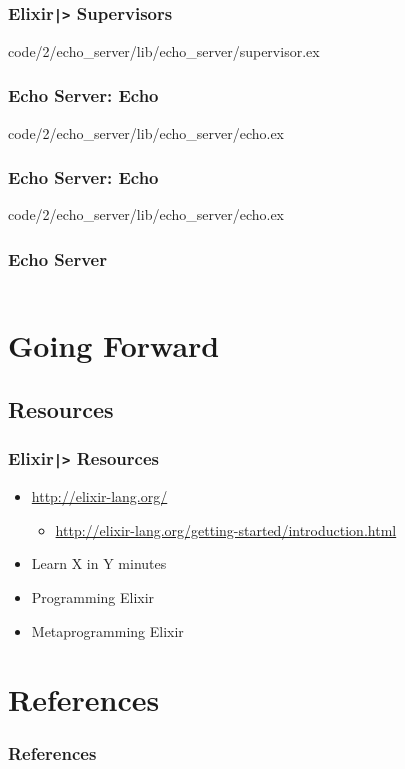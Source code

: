 \documentclass[english]{beamer}
\begin{document}
\begin{frame}[fragile]
\frametitle{Elixir\texttt{|>} Supervisors}

    {code/2/echo_server/lib/echo_server/supervisor.ex}
\end{frame}

\begin{frame}[fragile]
\frametitle{Echo Server: Echo}

    {code/2/echo_server/lib/echo_server/echo.ex}
\end{frame}

\begin{frame}[fragile]
\frametitle{Echo Server: Echo}

    {code/2/echo_server/lib/echo_server/echo.ex}
\end{frame}

\begin{frame}[fragile]
\frametitle{Echo Server}
\begin{columns}[c]


\end{columns}
\end{frame}

\section*{Going Forward}
\subsection*{Resources}
\begin{frame}
\frametitle{Elixir\texttt{|>} Resources}
\begin{itemize}
\item<2->{\url{http://elixir-lang.org/}}
\begin{itemize}
\item<2->{\url{http://elixir-lang.org/getting-started/introduction.html}}
\end{itemize}
\item<3->{Learn X in Y minutes~\cite{website:learnxiny}}
\item<4->{Programming Elixir~\cite{book:programming_elixir}}
\item<4->{Metaprogramming Elixir~\cite{book:metaprogramming_elixir}}
\end{itemize}
\end{frame}

\section*{References}
\begin{frame}[allowframebreaks]
\frametitle{References}
\nocite{*}
\renewcommand{\refname}{}


\end{frame}

\end{document}
